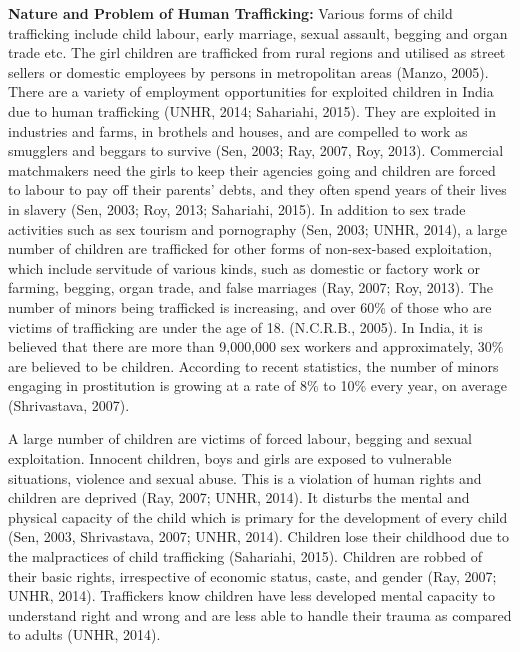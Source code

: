 \begin{multicols}{2}
\noi
\textbf{Nature and Problem of Human Trafficking:} Various forms of child trafficking
include child labour, early marriage, sexual assault, begging and organ trade etc. The
girl children are trafficked from rural regions and utilised as street sellers or domestic
employees by persons in metropolitan areas (Manzo, 2005). There are a variety of
employment opportunities for exploited children in India due to human trafficking
(UNHR, 2014; Sahariahi, 2015). They are exploited in industries and farms, in brothels
and houses, and are compelled to work as smugglers and beggars to survive (Sen, 2003;
Ray, 2007, Roy, 2013). Commercial matchmakers need the girls to keep their agencies
going and children are forced to labour to pay off their parents' debts, and they often
spend years of their lives in slavery (Sen, 2003; Roy, 2013; Sahariahi, 2015). In addition
to sex trade activities such as sex tourism and pornography (Sen, 2003; UNHR, 2014),
a large number of children are trafficked for other forms of non-sex-based exploitation,
which include servitude of various kinds, such as domestic or factory work or farming,
begging, organ trade, and false marriages (Ray, 2007; Roy, 2013). The number of
minors being trafficked is increasing, and over 60\% of those who are victims of
trafficking are under the age of 18. (N.C.R.B., 2005). In India, it is believed that there
are more than 9,000,000 sex workers and approximately, 30\% are believed to be
children. According to recent statistics, the number of minors engaging in prostitution
is growing at a rate of 8\% to 10\% every year, on average (Shrivastava, 2007).

\noi
A large number of children are victims of forced labour, begging and sexual
exploitation. Innocent children, boys and girls are exposed to vulnerable situations,
violence and sexual abuse. This is a violation of human rights and children are deprived
(Ray, 2007; UNHR, 2014). It disturbs the mental and physical capacity of the child
which is primary for the development of every child (Sen, 2003, Shrivastava, 2007;
UNHR, 2014). Children lose their childhood due to the malpractices of child trafficking
(Sahariahi, 2015). Children are robbed of their basic rights, irrespective of economic
status, caste, and gender (Ray, 2007; UNHR, 2014). Traffickers know children have
less developed mental capacity to understand right and wrong and are less able to
handle their trauma as compared to adults (UNHR, 2014).


\end{multicols}
